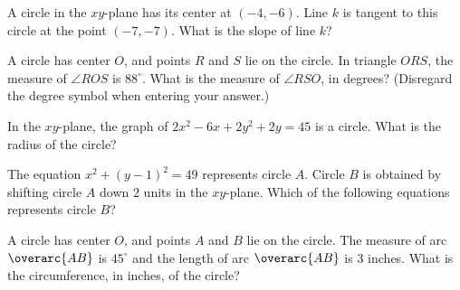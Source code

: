 \noindent\markforreview
\vspace{1em}

A circle in the $xy$-plane has its center at $(-4, -6)$. Line $k$ is tangent to this circle at the point $(-7, -7)$. What is the slope of line $k$?

\vspace{0.75em}


\vspace{2em}

\noindent\markforreview
\vspace{1em}

A circle has center $O$, and points $R$ and $S$ lie on the circle. In triangle $ORS$, the measure of $\angle ROS$ is $88^\circ$. What is the measure of $\angle RSO$, in degrees? (Disregard the degree symbol when entering your answer.)

\vspace{2em}
\newpage
\noindent\markforreview
\vspace{1em}

In the $xy$-plane, the graph of $2x^2 - 6x + 2y^2 + 2y = 45$ is a circle. What is the radius of the circle?

\vspace{0.75em}


\vspace{2em}

\noindent\markforreview
\vspace{1em}

The equation $x^2 + (y - 1)^2 = 49$ represents circle $A$. Circle $B$ is obtained by shifting circle $A$ down 2 units in the $xy$-plane. Which of the following equations represents circle $B$?

\vspace{0.75em}


\vspace{2em}
\newpage
\noindent\markforreview
\vspace{1em}

A circle has center $O$, and points $A$ and $B$ lie on the circle. The measure of arc $\overarc{AB}$ is $45^\circ$ and the length of arc $\overarc{AB}$ is $3$ inches. What is the circumference, in inches, of the circle?


